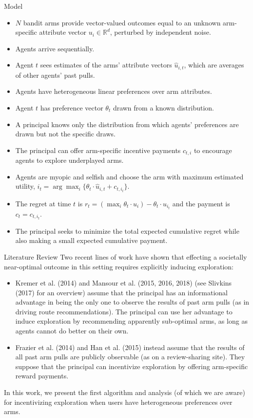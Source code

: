 \documentclass[final]{beamer}
\newlength{\onecolwid}
\begin{document}
\begin{frame}[t]
\begin{columns}[t]
\begin{column}{\onecolwid}
\begin{block}{Model}
\begin{itemize}
\item $N$ bandit arms provide vector-valued outcomes equal to an unknown arm-specific attribute vector $u_{i}\in \mathbb{R}^{d}$, perturbed by independent noise. 
\item Agents arrive sequentially.
\item Agent $t$ sees estimates of the arms’ attribute vectors $\hat{u}_{i,t}$, which are averages of other agents’ past pulls. 
\item Agents have heterogeneous linear preferences over arm attributes.
\item Agent $t$ has preference vector $\theta_t$ drawn from a known distribution.
\item A principal knows only the distribution from which agents’ preferences are drawn but not the specific draws.
\item The principal can offer arm-specific incentive payments $c_{t,i}$ to encourage agents to explore underplayed arms. 
\item Agents are myopic and selfish and choose the arm with maximum estimated utility, $i_t = \arg\max_{i}\{\theta_{t}\cdot \hat{u}_{i,t} + c_{t,i_t}\}$.
\item The regret at time $t$ is $r_t = (\max_{i} \theta_t \cdot u_i) - \theta_t \cdot u_{i_t}$ and the payment is $c_t = c_{t,i_t}$.
\item The principal seeks to minimize the total expected cumulative regret while also making a small expected cumulative payment.
\end{itemize}
\end{block}

\begin{block}{Literature Review}
Two recent lines of work have shown that effecting a societally near-optimal outcome in this setting requires explicitly inducing exploration:
\begin{itemize}
\item Kremer et al. (2014) and Mansour et al. (2015, 2016, 2018) (see Slivkins (2017) for an overview) assume that the principal has an informational advantage in being the only one to observe the results of past arm pulls (as in driving route recommendations). The principal can use her advantage to induce exploration by recommending apparently sub-optimal arms, as long as agents cannot do better on their own.
\item Frazier et al. (2014) and Han et al. (2015) instead assume that the results of all past arm pulls are publicly observable (as on a review-sharing site). They suppose that the principal can incentivize exploration by offering arm-specific reward payments.
\end{itemize}
In this work, we present the first algorithm and analysis (of which we are aware) for incentivizing exploration when users have heterogeneous preferences over arms.
\end{block}


\end{column}
\end{columns}
\end{frame}
\end{document}

